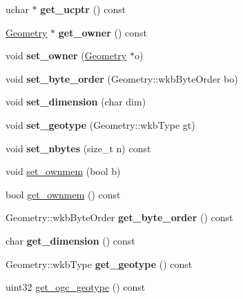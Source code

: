 \begin{DoxyCompactItemize}
uchar $\ast$ {\bfseries get\+\_\+ucptr} () const
\item 
\mbox{\label{classGeometry_a815519e4076c1598fceb7330355caa2c}} 
\mbox{\hyperlink{classGeometry}{Geometry}} $\ast$ {\bfseries get\+\_\+owner} () const
\item 
\mbox{\label{classGeometry_a8c0dbb25a1e4e5bce119bd7d76936394}} 
void {\bfseries set\+\_\+owner} (\mbox{\hyperlink{classGeometry}{Geometry}} $\ast$o)
\item 
\mbox{\label{classGeometry_a07171a9e802b315728eabc342eb835a1}} 
void {\bfseries set\+\_\+byte\+\_\+order} (Geometry\+::wkb\+Byte\+Order bo)
\item 
\mbox{\label{classGeometry_ab26639b19b8ae8920e165bc69fcd5cc2}} 
void {\bfseries set\+\_\+dimension} (char dim)
\item 
\mbox{\label{classGeometry_ada33a0e36e86e5620c5c7938a61f6352}} 
void {\bfseries set\+\_\+geotype} (Geometry\+::wkb\+Type gt)
\item 
\mbox{\label{classGeometry_aeac4db7e3d813cc9c921aebb0d5d5d52}} 
void {\bfseries set\+\_\+nbytes} (size\+\_\+t n) const
\item 
void \mbox{\hyperlink{classGeometry_a1037b25eaa5591e899843ed79519b543}{set\+\_\+ownmem}} (bool b)
\item 
bool \mbox{\hyperlink{classGeometry_ac2f735f86392075949ec67c3749d86d7}{get\+\_\+ownmem}} () const
\item 
\mbox{\label{classGeometry_acabef5bb20c1f154e0733f4aa09808d8}} 
Geometry\+::wkb\+Byte\+Order {\bfseries get\+\_\+byte\+\_\+order} () const
\item 
\mbox{\label{classGeometry_a5adfb8ddfe4d1daf84a2a5c6b79ec2f8}} 
char {\bfseries get\+\_\+dimension} () const
\item 
\mbox{\label{classGeometry_ade9ea498fd56243bdd54208a4021c326}} 
Geometry\+::wkb\+Type {\bfseries get\+\_\+geotype} () const
\item 
uint32 \mbox{\hyperlink{classGeometry_ab403ca936728c5d8ef81e0db535236b3}{get\+\_\+ogc\+\_\+geotype}} () const

\end{DoxyCompactItemize}
